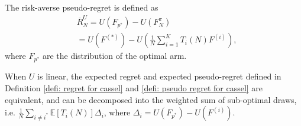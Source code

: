 \begin{defi}
The risk-averse pseudo-regret is defined as
 \label{defi: pseudo regret for cassel}
\begin{align}
    & \overline{R}_N^{U} =U\left(F_{p^{*}}\right)-U\left(F_{N}^{\pi}\right)\\
    & = U\left(F^{(\ast)}\right)-U\left(\frac{1}{N} \sum_{i=1}^{K} T_{i}(N) F^{(i)}\right),
\end{align}
where $F_{p^{*}}$ are the distribution of the optimal arm.
\end{defi}


\begin{prop}
When $U$ is linear, the expected regret and expected pseudo-regret defined in Definition \ref{defi: regret for cassel} and \ref{defi: pseudo regret for cassel} are equivalent, and can be decomposed into the weighted sum of sub-optimal draws, i.e. $\frac{1}{N} \sum_{i \neq i^{*}} \mathbb{E}\left[T_{i}(N)\right] \Delta_{i}$, where $\Delta_{i}=U\left(F_{p^{*}}\right)-U\left(F^{(i)}\right)$.
\end{prop}

